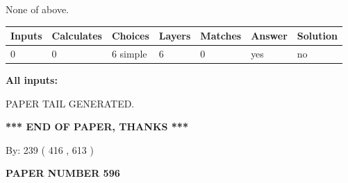 \documentclass[12pt]{article}
\begin{document}
 
 None of above.
 
 
\noindent{}
 
 
   
   
   
   
\noindent\begin{tabular}{|l|l|l|l|l|l|l|}
 \hline
Inputs & Calculates & Choices & Layers & Matches & Answer & Solution \\ \hline
 0  & 
 0  & 
 6
  simple  
  & 
 6  & 
 0  & 
  yes & 
  no 
  \\ \hline
 \end{tabular}
   
   
   
   
\noindent{}
   
   
   
   
\noindent\vspace{0.1in}\hspace{-0.08in} {\textbf{\Large{All inputs: }}}
   
   
   
   
   
   
 \vspace{0.2in}
 
   
   
\vspace{2.0in} PAPER TAIL GENERATED.
   
   
   
   
\vspace{1.0in} 
{\textbf{\large{ *** END OF PAPER, THANKS *** }}} 
   
   
\hspace{1.0in} By: 
 239 ( 416 ,  613 )
   
   
   
   
\newpage 
\setcounter{page}{ 
   596001 } 
   
   
   
   
 {\textbf{ \Large{ PAPER NUMBER  596  }}}
   
   
\vspace{0.2in}
   
   
   
   
   
   
   
\end{document}
